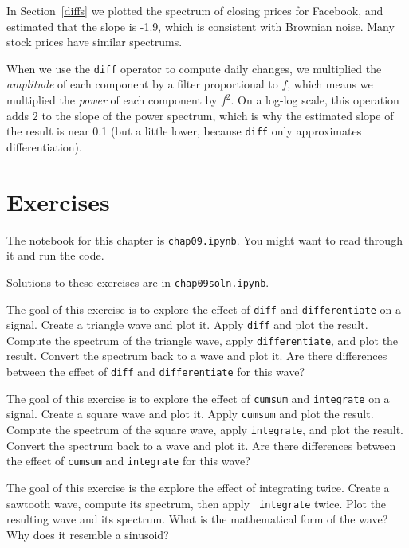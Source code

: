\documentclass[12pt]{book}
\begin{document}
In Section~\ref{diffs} we plotted the spectrum of closing prices for
Facebook, and estimated that the slope is -1.9, which is consistent
with Brownian noise.  Many stock prices have similar spectrums.

When we use the {\tt diff} operator to compute daily changes, we
multiplied the {\em amplitude} of each component by a filter proportional to
$f$, which means we multiplied the {\em power} of each component by $f^2$.
On a log-log scale, this operation adds 2 to the slope of the
power spectrum, which is why the estimated slope of the result
is near 0.1 (but a little lower, because {\tt diff} only approximates
differentiation).



\section{Exercises}

The notebook for this chapter is {\tt chap09.ipynb}.
You might want to read through it and run the code.

Solutions to these exercises are in {\tt chap09soln.ipynb}.

\begin{exercise}
The goal of this exercise is to explore the effect of {\tt diff} and
{\tt differentiate} on a signal. Create a triangle wave and plot
it. Apply {\tt diff} and plot the result. Compute the spectrum of the
triangle wave, apply {\tt differentiate}, and plot the result. Convert
the spectrum back to a wave and plot it. Are there differences between
the effect of {\tt diff} and {\tt differentiate} for this wave?
\end{exercise}

\begin{exercise}
The goal of this exercise is to explore the effect of {\tt cumsum} and
{\tt integrate} on a signal. Create a square wave and plot it. Apply
{\tt cumsum} and plot the result. Compute the spectrum of the square
wave, apply {\tt integrate}, and plot the result. Convert the spectrum
back to a wave and plot it. Are there differences between the effect
of {\tt cumsum} and {\tt integrate} for this wave?
\end{exercise}

\begin{exercise}
The goal of this exercise is the explore the effect of integrating
twice. Create a sawtooth wave, compute its spectrum, then apply {\tt
  integrate} twice. Plot the resulting wave and its spectrum. What is
the mathematical form of the wave? Why does it resemble a sinusoid?
\end{exercise}
\end{document}

